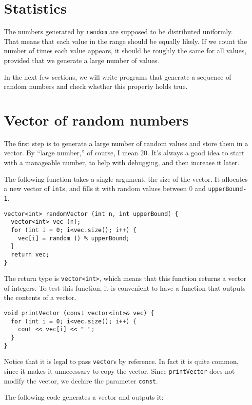 \section{Statistics}

The numbers generated by {\tt random} are supposed to be distributed
uniformly.  That means that each value in the range should be
equally likely.  If we count the number of times each value appears,
it should be roughly the same for all values, provided that we
generate a large number of values.

In the next few sections, we will write programs that generate
a sequence of random numbers and check whether this property
holds true.

\section{Vector of random numbers}

The first step is to generate a large number of random values
and store them in a vector.  By ``large number,'' of course,
I mean 20.  It's always a good idea to start with a manageable
number, to help with debugging, and then increase it later.

The following function takes a single argument, the size of
the vector.  It allocates a new vector of {\tt int}s, 
and fills it with random values between 0 and {\tt upperBound-1}.

\begin{verbatim}
vector<int> randomVector (int n, int upperBound) {
  vector<int> vec (n);
  for (int i = 0; i<vec.size(); i++) {
    vec[i] = random () % upperBound;
  }
  return vec;
}
\end{verbatim}
%
The return type is {\tt vector<int>}, which means that
this function returns a vector of integers.
To test this function, it is convenient to have a function that
outputs the contents of a vector.

\begin{verbatim}
void printVector (const vector<int>& vec) {
  for (int i = 0; i<vec.size(); i++) {
    cout << vec[i] << " ";
  }
}
\end{verbatim}
%
Notice that it is legal to pass {\tt vector}s by reference.
In fact it is quite common, since it makes it unnecessary to
copy the vector.  Since {\tt printVector} does not modify the
vector, we declare the parameter {\tt const}.

The following code generates a vector and outputs it:

